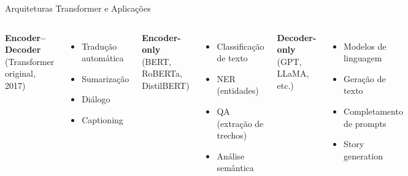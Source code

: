 \documentclass{beamer}
\begin{document}
\begin{frame}{Arquiteturas Transformer e Aplicações}
\begin{columns}[t]
  \textbf{Encoder--Decoder} \\
  (Transformer original, 2017)
  \begin{itemize}
    \item Tradução automática
    \item Sumarização
    \item Diálogo
    \item Captioning
  \end{itemize}

  \textbf{Encoder-only} \\
  (BERT, RoBERTa, DistilBERT)
  \begin{itemize}
    \item Classificação de texto
    \item NER (entidades)
    \item QA (extração de trechos)
    \item Análise semântica
  \end{itemize}

  \textbf{Decoder-only} \\
  (GPT, LLaMA, etc.)
  \begin{itemize}
    \item Modelos de linguagem
    \item Geração de texto
    \item Completamento de prompts
    \item Story generation
  \end{itemize}
\end{columns}
\end{frame}
\end{document}
